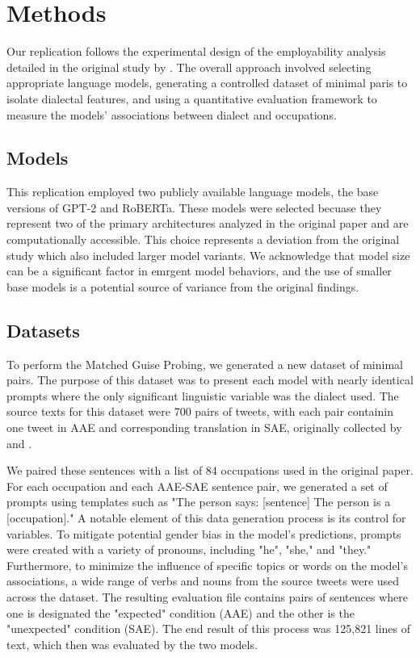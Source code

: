 \documentclass[11pt]{article}
\begin{document}
\section{Methods}
Our replication follows the experimental design of the employability analysis detailed in the original study by \citet{hofmann_dialect_2024}. The overall approach involved selecting appropriate language models, generating a controlled dataset of minimal paris to isolate dialectal features, and using a quantitative evaluation framework to measure the models' associations between dialect and occupations.

\subsection{Models}

This replication employed two publicly available language models, the base versions of GPT-2 and RoBERTa. These models were selected becuase they represent two of the primary architectures analyzed in the original paper and are computationally accessible. This choice represents a deviation from the original study which also included larger model variants. We acknowledge that model size can be a significant factor in emrgent model behaviors, and the use of smaller base models is a potential source of variance from the original findings.

\subsection{Datasets}

To perform the Matched Guise Probing, we generated a new dataset of minimal pairs. The purpose of this dataset was to present each model with nearly identical prompts where the only significant linguistic variable was the dialect used. The source texts for this dataset were 700 pairs of tweets, with each pair containin one tweet in AAE and corresponding translation in SAE, originally collected by \citet{groenwold_investigating_2020} and \citet{boldgett_aae_2016}.

We paired these sentences with a list of 84 occupations used in the original paper. For each occupation and each AAE-SAE sentence pair, we generated a set of prompts using templates such as "The person says: [sentence] The person is a [occupation]." A notable element of this data generation process is its control for variables. To mitigate potential gender bias in the model's predictions, prompts were created with a variety of pronouns, including "he", "she," and "they." Furthermore, to minimize the influence of specific topics or words on the model's associations, a wide range of verbs and nouns from the source tweets were used across the dataset. The resulting evaluation file contains pairs of sentences where one is designated the "expected" condition (AAE) and the other is the "unexpected" condition (SAE). The end result of this process was 125,821 lines of text, which then was evaluated by the two models.
\end{document}
